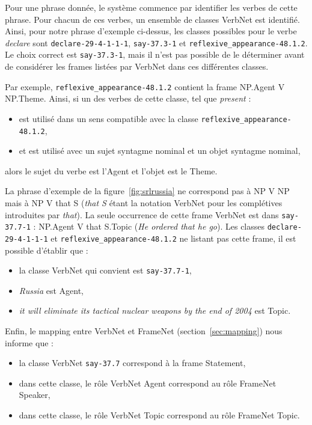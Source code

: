 Pour une phrase donnée, le système commence par identifier les verbes de
cette phrase. Pour chacun de ces verbes, un ensemble de classes VerbNet est
identifié. Ainsi, pour notre phrase d'exemple ci-dessus, les classes possibles
pour le verbe \emph{declare} sont \texttt{declare-29-4-1-1-1},
\texttt{say-37.3-1} et \texttt{reflexive\_appearance-48.1.2}. Le choix correct
est \texttt{say-37.3-1}, mais il n'est pas possible de le déterminer avant de
considérer les frames listées par VerbNet dans ces différentes classes.

Par exemple, \texttt{reflexive\_appearance-48.1.2} contient la frame NP.Agent V
NP.Theme. Ainsi, si un des verbes de cette classe, tel que \emph{present} :
\begin{itemize}
    \item est utilisé dans un sens compatible avec la classe
        \texttt{reflexive\_appearance-48.1.2},
    \item et est utilisé avec un sujet syntagme nominal et un objet syntagme
        nominal,
\end{itemize}
alors le sujet du verbe est l'Agent et l'objet est le Theme.

La phrase d'exemple de la figure~\ref{fig:srlrussia} ne correspond pas à NP V
NP mais à NP V that S (\emph{that S} étant la notation VerbNet pour les
complétives introduites par \emph{that}). La seule occurrence de cette frame
VerbNet est dans \texttt{say-37.7-1} : NP.Agent V that S.Topic (\emph{He
ordered that he go}). Les classes \texttt{declare-29-4-1-1-1} et
\texttt{reflexive\_appearance-48.1.2} ne listant pas cette frame, il est
possible d'établir que :

\begin{itemize}
    \item la classe VerbNet qui convient est \texttt{say-37.7-1},
    \item \emph{Russia} est Agent,
    \item \emph{it will eliminate its tactical nuclear weapons by the end of 2004} est Topic.
\end{itemize}

Enfin, le mapping entre VerbNet et FrameNet (section~\ref{sec:mapping}) nous
informe que :

\begin{itemize}
    \item la classe VerbNet \texttt{say-37.7} correspond à la frame Statement,
    \item dans cette classe, le rôle VerbNet Agent correspond au rôle FrameNet Speaker,
    \item dans cette classe, le rôle VerbNet Topic correspond au rôle FrameNet Topic.
\end{itemize}

